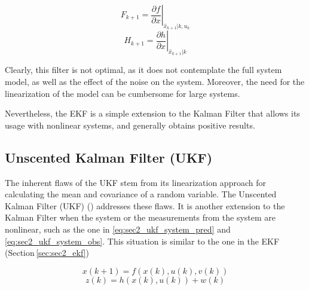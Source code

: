\documentclass[10pt,twocolumn]{IEEEtran}
\begin{document}
 \begin{equation}
    \label{eq:sec2_ekf_lin_pre}
    F_{k+1}=\left. \frac{\partial f}{\partial x}\right|_{\hat{x}_{k+1}|k, u_k}
\end{equation}
\begin{equation}
    \label{eq:sec2_ekf_lin_meas}
    H_{k+1}=\left. \frac{\partial h}{\partial x}\right|_{\hat{x}_{k+1}|k}
\end{equation}

Clearly, this filter is not optimal, as it does not contemplate the full system model, as well as the effect of the noise on the system. Moreover, the need for the linearization of the model can be cumbersome for large systems. 

Nevertheless, the EKF is a simple extension to the Kalman Filter that allows its usage with nonlinear systems, and generally obtains positive results.

\subsection{Unscented Kalman Filter (UKF)}
\label{sec:sec2_ukf}

The inherent flaws of the UKF stem from its linearization approach for calculating the mean and covariance of a random variable. The Unscented Kalman Filter (UKF) (\cite{julier1997new}) addresses these flaws. It is another extension to the Kalman Filter when the system or the measurements from the system are nonlinear, such as the one in \eqref{eq:sec2_ukf_system_pred} and \eqref{eq:sec2_ukf_system_obs}. This situation is similar to the one in the EKF (Section\,\ref{sec:sec2_ekf})%

\begin{equation}
    \label{eq:sec2_ukf_system_pred}
    x(k+1) = f(x(k),u(k),v(k))
\end{equation}
\begin{equation}
    \label{eq:sec2_ukf_system_obs}
    z(k)=h(x(k), u(k)) + w(k)
\end{equation}
\end{document}
